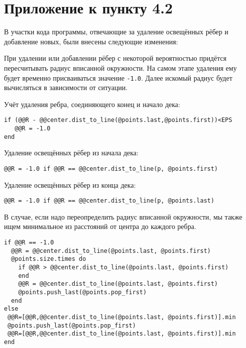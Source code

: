 \section{Приложение к пункту 4.2}

В участки кода программы, отвечающие за удаление освещённых рёбер и добавление новых, были внесены следующие изменения:

При удалении или добавлении рёбер с некоторой вероятностью придётся пересчитывать радиус
  вписанной окружности. На самом этапе удаления ему будет временно присваиваться значение
    \verb|-1.0|. Далее искомый радиус будет вычисляться в зависимости от ситуации.


Учёт удаления ребра, соединяющего конец и начало дека:
\begin{lstlisting}
if (@@R - @@center.dist_to_line(@points.last,@points.first))<EPS
   @@R = -1.0
end
\end{lstlisting}


 Удаление освещённых рёбер из начала дека:
\begin{lstlisting}
@@R = -1.0 if @@R == @@center.dist_to_line(p, @points.first)
\end{lstlisting}

Удаление освещённых рёбер из конца дека:
\begin{lstlisting}
@@R = -1.0 if @@R == @@center.dist_to_line(p, @points.last)
\end{lstlisting}

В случае, если надо переопределить радиус вписанной окружности, мы также ищем минимальное
 из расстояний от центра до каждого ребра.

\begin{lstlisting}
if @@R == -1.0
  @@R = @@center.dist_to_line(@points.last, @points.first)
  @points.size.times do
    if @@R > @@center.dist_to_line(@points.last, @points.first)
    end
    @@R = @@center.dist_to_line(@points.last, @points.first)
    @points.push_last(@points.pop_first)
  end
else
 @@R=[@@R,@@center.dist_to_line(@points.last, @points.first)].min
 @points.push_last(@points.pop_first)
 @@R=[@@R,@@center.dist_to_line(@points.last, @points.first)].min
end
\end{lstlisting}
